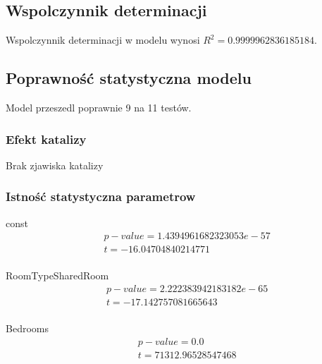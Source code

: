 \subsection{Wspolczynnik determinacji}\label{subsec:wspolczynnik-determinacji}

Wspolczynnik determinacji w modelu wynosi \(R^{2} = 0.9999962836185184\).

\subsection{Poprawność statystyczna modelu}\label{poprawnośc-statystyczna-modelu}

Model przeszedl poprawnie 9 na 11 testów.

\subsubsection{Efekt katalizy}\label{efekt-katalizy}


Brak zjawiska katalizy

\subsubsection{Istność statystyczna parametrow}\label{istotność-parametrów}

const
\begin{equation}
    \begin{split}
        &p-value= 1.4394961682323053e-57 \\ &t = -16.04704840214771  \\
    \end{split}
\end{equation}

RoomTypeSharedRoom
\begin{equation}
    \begin{split}
        &p-value= 2.222383942183182e-65  \\ &t = -17.142757081665643 \\
    \end{split}
\end{equation}


Bedrooms
\begin{equation}
    \begin{split}
         &p-value= 0.0  \\ &t = 71312.96528547468 \\
    \end{split}
\end{equation}


